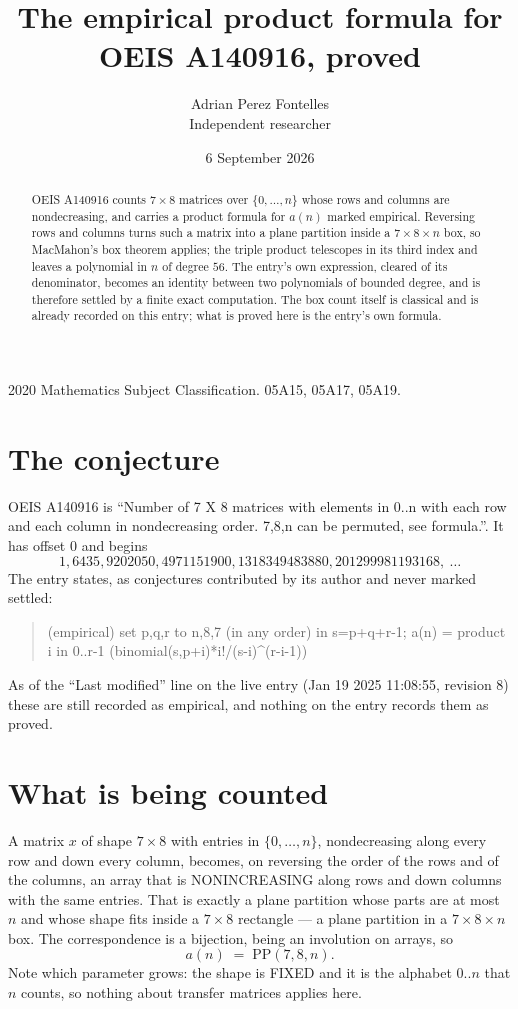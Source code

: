 \documentclass[11pt,a4paper]{article}
\title{The empirical product formula for OEIS A140916, proved}
\author{Adrian Perez Fontelles\\ \small Independent researcher}
\date{6 September 2026}
\theoremstyle{plain}
\theoremstyle{definition}
\begin{document}
\maketitle

\begin{abstract}
OEIS A140916 counts $7\times8$ matrices over $\{0,\dots,n\}$ whose rows and columns are
nondecreasing, and carries a product formula for $a(n)$ marked empirical. Reversing rows and
columns turns such a matrix into a plane partition inside a $7\times8\times n$ box, so
MacMahon's box theorem applies; the triple product telescopes in its third index and leaves a
polynomial in $n$ of degree $56$. The entry's own expression, cleared of its denominator,
becomes an identity between two polynomials of bounded degree, and is therefore settled by a
finite exact computation. The box count itself is classical and is already recorded on this
entry; what is proved here is the entry's own formula.
\end{abstract}

\noindent\small 2020 Mathematics Subject Classification. 05A15, 05A17, 05A19.\normalsize

\section{The conjecture}

OEIS A140916 is ``Number of 7 X 8 matrices with elements in 0..n with each row and each column in nondecreasing order. 7,8,n can be permuted, see formula.''. It has offset $0$ and begins
\[
1, 6435, 9202050, 4971151900, 1318349483880, 201299981193168,\ \dots
\]
The entry states, as conjectures contributed by its author and never marked settled:
\begin{quote}
(empirical) set p,q,r to n,8,7 (in any order) in s=p+q+r-1; a(n) = product {i in 0..r-1} (binomial(s,p+i)*i!/(s-i)\^{}(r-i-1))

\end{quote}
As of the ``Last modified'' line on the live entry (Jan 19 2025 11:08:55, revision 8) these are still
recorded as empirical, and nothing on the entry records them as proved.

\section{What is being counted}

A matrix $x$ of shape $7\times8$ with entries in $\{0,\dots,n\}$, nondecreasing along
every row and down every column, becomes, on reversing the order of the rows and of the
columns, an array that is NONINCREASING along rows and down columns with the same entries. That
is exactly a plane partition whose parts are at most $n$ and whose shape fits inside a
$7\times8$ rectangle --- a plane partition in a $7\times8\times n$ box. The
correspondence is a bijection, being an involution on arrays, so
\[
a(n)\;=\;\mathrm{PP}(7,8,n).
\]
Note which parameter grows: the shape is FIXED and it is the alphabet $0..n$ that $n$ counts,
so nothing about transfer matrices applies here.
\end{document}
